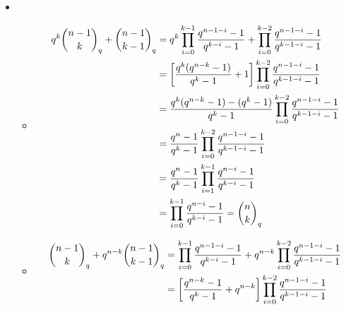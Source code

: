 \documentclass[a4paper, 11pt]{article}
\begin{document}
{\begin{itemize}
Now for any $k$-dimensional subspace of $V$ is spanned by $k$ linearly independent vectors of $V$. But same $k$-dimensional subspace can be generated by multiple set of $k$ linearly independent vectors. So we have to divide the total number of ways to chose $k$ linearly independent subsets from $V$ by total number of ways to chose $k$ linearly independent subsets from a $k$-dimensional vector space. So number of different $k$-dimensional subspaces of $V$ is $\frac{\frac1{k!}\prod\limits_{i=0}^{k-1}(q^n-q^i)}{\frac1{k!}\prod\limits_{i=0}^{k-1}(q^k-q^i)}=\frac{\prod\limits_{i=0}^{k-1}(q^n-q^i)}{\prod\limits_{i=0}^{k-1}(q^k-q^i)}$. Therefore $\binom{n}{k}_q=\prod\limits_{i=0}^{k-1}\frac{q^n-q^i}{q^k-q^i}=\prod\limits_{i=0}^{k-1}\frac{q^{n-i}-1}{q^{k-i}-1}$. 
\item \begin{itemize}
	\item  \begin{align*}
		q^k\binom{n-1}{k}_q+\binom{n-1}{k-1}_q & = q^k\prod\limits_{i=0}^{k-1}\frac{q^{n-1-i}-1}{q^{k-i}-1} + \prod\limits_{i=0}^{k-2}\frac{q^{n-1-i}-1}{q^{k-1-i}-1} \\
		                                       & = \left[\frac{q^k(q^{n-k}-1)}{q^{k}-1}+1\right]\prod_{i=0}^{k-2}\frac{q^{n-1-i}-1}{q^{k-1-i}-1}                           \\
		                                       & = \frac{q^k(q^{n-k}-1)- (q^k-1)}{q^{k}-1}\prod_{i=0}^{k-2}\frac{q^{n-1-i}-1}{q^{k-1-i}-1}                            \\
		                                       & = \frac{q^n-1}{q^k-1}\prod_{i=0}^{k-2}\frac{q^{n-1-i}-1}{q^{k-1-i}-1}                                                \\
		                                       & = \frac{q^n-1}{q^k-1}\prod_{i=1}^{k-1}\frac{q^{n-i}-1}{q^{k-i}-1}                                                    \\
		                                       & =\prod_{i=0}^{k-1}\frac{q^{n-i}-1}{q^{k-i}-1}= \binom{n}{k}_q
	\end{align*}
\item \begin{align*}
	\binom{n-1}{k}_q+q^{n-k} \binom{n-1}{k-1}_q & = \prod\limits_{i=0}^{k-1}\frac{q^{n-1-i}-1}{q^{k-i}-1} + q^{n-k}\prod\limits_{i=0}^{k-2}\frac{q^{n-1-i}-1}{q^{k-1-i}-1} \\
	                                            & = \lt[\frac{q^{n-k}-1}{q^{k}-1}+q^{n-k}\rt]\prod_{i=0}^{k-2}\frac{q^{n-1-i}-1}{q^{k-1-i}-1}                              \\

\end{align*}
\end{itemize}
\end{itemize}}
\end{document}
